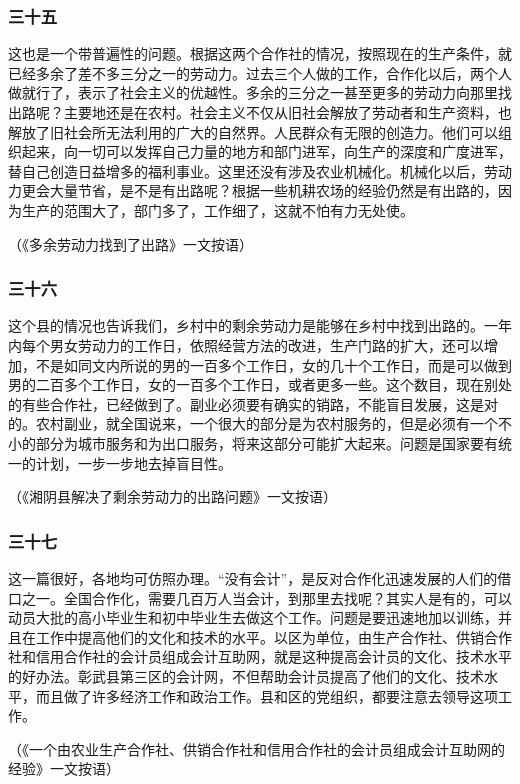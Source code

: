 \documentclass[cn,11pt,chinese]{elegantbook}
\def\myformat#1{\hfil\hfil #1}
\begin{document}
\subsubsection*{\myformat{三十五}}
这也是一个带普遍性的问题。根据这两个合作社的情况，按照现在的生产条件，就已经多余了差不多三分之一的劳动力。过去三个人做的工作，合作化以后，两个人做就行了，表示了社会主义的优越性。多余的三分之一甚至更多的劳动力向那里找出路呢？主要地还是在农村。社会主义不仅从旧社会解放了劳动者和生产资料，也解放了旧社会所无法利用的广大的自然界。人民群众有无限的创造力。他们可以组织起来，向一切可以发挥自己力量的地方和部门进军，向生产的深度和广度进军，替自己创造日益增多的福利事业。这里还没有涉及农业机械化。机械化以后，劳动力更会大量节省，是不是有出路呢？根据一些机耕农场的经验仍然是有出路的，因为生产的范围大了，部门多了，工作细了，这就不怕有力无处使。\\
\begin{flushright}（《多余劳动力找到了出路》一文按语）\end{flushright}
\subsubsection*{\myformat{三十六}}
这个县的情况也告诉我们，乡村中的剩余劳动力是能够在乡村中找到出路的。一年内每个男女劳动力的工作日，依照经营方法的改进，生产门路的扩大，还可以增加，不是如同文内所说的男的一百多个工作日，女的几十个工作日，而是可以做到男的二百多个工作日，女的一百多个工作日，或者更多一些。这个数目，现在别处的有些合作社，已经做到了。副业必须要有确实的销路，不能盲目发展，这是对的。农村副业，就全国说来，一个很大的部分是为农村服务的，但是必须有一个不小的部分为城市服务和为出口服务，将来这部分可能扩大起来。问题是国家要有统一的计划，一步一步地去掉盲目性。\\
\begin{flushright}（《湘阴县解决了剩余劳动力的出路问题》一文按语）\end{flushright}
\subsubsection*{\myformat{三十七}}
这一篇很好，各地均可仿照办理。“没有会计”，是反对合作化迅速发展的人们的借口之一。全国合作化，需要几百万人当会计，到那里去找呢？其实人是有的，可以动员大批的高小毕业生和初中毕业生去做这个工作。问题是要迅速地加以训练，并且在工作中提高他们的文化和技术的水平。以区为单位，由生产合作社、供销合作社和信用合作社的会计员组成会计互助网，就是这种提高会计员的文化、技术水平的好办法。彰武县第三区的会计网，不但帮助会计员提高了他们的文化、技术水平，而且做了许多经济工作和政治工作。县和区的党组织，都要注意去领导这项工作。\\
\begin{flushright}（《一个由农业生产合作社、供销合作社和信用合作社的会计员组成会计互助网的经验》一文按语）\end{flushright}
\end{document}
